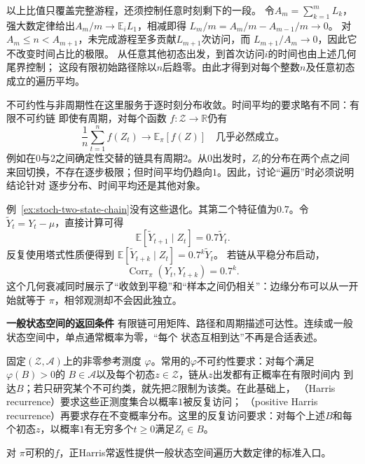 以上比值只覆盖完整游程，还须控制任意时刻剩下的一段。
令$A_m=\sum_{k=1}^mL_k$，强大数定律给出$A_m/m\to\mathbb E_iL_1$，相减即得
$L_m/m=A_m/m-A_{m-1}/m\to0$。
对$A_m\leq n<A_{m+1}$，未完成游程至多贡献$L_{m+1}$次访问，而
$L_{m+1}/A_m\to0$，因此它不改变时间占比的极限。
从任意其他初态出发，到首次访问$i$的时间也由上述几何尾界控制；
这段有限初始路径除以$n$后趋零。由此才得到对每个整数$n$及任意初态成立的遍历平均。

不可约性与非周期性在这里服务于逐时刻分布收敛。时间平均的要求略有不同：有限不可约链
即使有周期，对每个函数
$f:\mathcal{Z}\to\mathbb{R}$仍有
\begin{equation}
  \frac1n\sum_{t=1}^{n}f(Z_t)\longrightarrow\mathbb{E}_{\pi}[f(Z)]
  \quad\text{几乎必然成立。}
  \label{eq:stoch-markov-ergodic-average}
\end{equation}
例如在$0$与$2$之间确定性交替的链具有周期$2$。从$0$出发时，$Z_t$的分布在两个点之间
来回切换，不存在逐步极限；但时间平均仍趋向$1$。因此，讨论“遍历”时必须说明结论针对
逐步分布、时间平均还是其他对象。

例~\ref{ex:stoch-two-state-chain}没有这些退化。其第二个特征值为$0.7$。令
$\widetilde{Y}_t=Y_t-\mu$，直接计算可得
\begin{equation}
  \mathbb{E}[\widetilde{Y}_{t+1}\mid Z_t]=0.7\widetilde{Y}_t.
  \label{eq:stoch-two-state-eigenfunction}
\end{equation}
反复使用塔式性质便得到
$\mathbb{E}[\widetilde{Y}_{t+k}\mid Z_t]=0.7^k\widetilde{Y}_t$。
若链从平稳分布启动，
\begin{equation}
  \operatorname{Corr}_{\pi}(Y_t,Y_{t+k})=0.7^k.
  \label{eq:stoch-two-state-autocorrelation}
\end{equation}
这个几何衰减同时展示了“收敛到平稳”和“样本之间仍相关”：边缘分布可以从一开始就等于
$\pi$，相邻观测却不会因此独立。

\par\medskip\noindent\textbf{一般状态空间的返回条件}\quad
有限链可用矩阵、路径和周期描述可达性。连续或一般状态空间中，单点通常概率为零，“每个
状态互相到达”不再是合适表述。
\begin{definition}[一般状态空间的不可约性与Harris常返性]
  \label{def:stoch-harris-recurrence}
固定$(\mathcal{Z},\mathcal{A})$上的非零参考测度
$\varphi$。常用的$\varphi$不可约性要求：对每个满足$\varphi(B)>0$的
$B\in\mathcal{A}$以及每个初态$z\in\mathcal{Z}$，链从$z$出发都有正概率在有限时间内
到达$B$；若只研究某个不可约类，就先把$\mathcal{Z}$限制为该类。在此基础上，
（Harris recurrence）要求这些正测度集合以概率$1$被反复访问；
（positive Harris recurrence）再要求存在不变概率分布。这里的反复访问要求：对每个上述\(B\)和每个初态\(z\)，以概率\(1\)有无穷多个\(t\geq0\)满足\(Z_t\in B\)。
\end{definition}
对
$\pi$可积的$f$，正Harris常返性提供一般状态空间遍历大数定律的标准入口。

